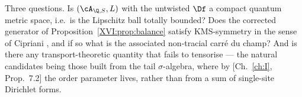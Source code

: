Three questions. Is $(\cA_{\Q,S},L)$ with the untwisted $\Df$ a compact quantum metric
space, i.e.\ is the Lipschitz ball totally bounded? Does the corrected generator of
Proposition~\ref{XVI:prop:balance} satisfy KMS-symmetry in the sense of Cipriani
\cite{Cipriani}, and if so what
is the associated non-tracial carré du champ? And is there any transport-theoretic quantity
that fails to tensorise --- the natural candidates being those built from the tail
$\sigma$-algebra, where by [Ch.~\ref{ch:I}, Prop.~7.2] the order parameter lives, rather than
from a sum of single-site Dirichlet forms.


